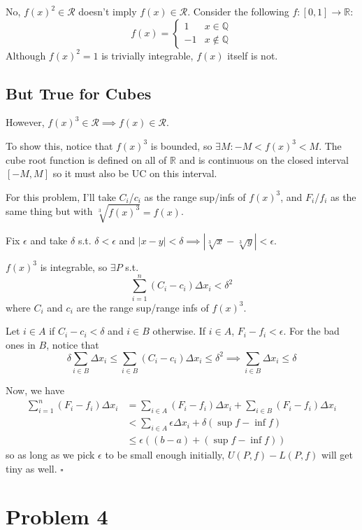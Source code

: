 \documentclass[12pt]{article}
\newcommand{\R}{\mathbb{R}}
\newcommand{\Q}{\mathbb{Q}}
\begin{document}
No, $f(x)^2 \in \mathcal{R}$ doesn't imply $f(x) \in \mathcal{R}$.
Consider the following $f: [0, 1] \to \R$:
\[f(x)=\begin{cases}
    1  & x \in \Q    \\
    -1 & x \notin \Q
  \end{cases}\]
Although $f(x)^2=1$ is trivially integrable, $f(x)$ itself is not.

\subsection{But True for Cubes}

However, $f(x)^3 \in \mathcal{R} \implies f(x) \in \mathcal{R}$.

To show this, notice that $f(x)^3$ is bounded, so $\exists M: -M < f(x)^3 < M$.
The cube root function is defined on all of $\R$ and is continuous on the
closed interval $[-M, M]$ so it must also be UC on this interval.

For this problem, I'll take $C_i$/$c_i$ as the range sup/infs of $f(x)^3$,
and $F_i$/$f_i$ as the same thing but with $\sqrt[3]{f(x)^3}=f(x)$.

Fix $\epsilon$ and take $\delta$ s.t. $\delta < \epsilon$
and $|x-y| < \delta \implies \left|\sqrt[3]{x}-\sqrt[3]{y}\right| < \epsilon$.

$f(x)^3$ is integrable, so $\exists P$ s.t.
\[\sum_{i=1}^{n} (C_i-c_i)\Delta x_i < \delta^2\]
where $C_i$ and $c_i$ are the range sup/range infs of $f(x)^3$.

Let $i \in A$ if $C_i-c_i < \delta$ and $i \in B$ otherwise.
If $i \in A$, $F_i-f_i < \epsilon$.
For the bad ones in $B$, notice that
\[\delta\sum_{i \in B} \Delta x_i \le \sum_{i \in B} (C_i-c_i)\Delta x_i \le \delta^2
  \implies \sum_{i \in B} \Delta x_i \le \delta\]

Now, we have
\begin{align*}
  \sum_{i=1}^{n} (F_i-f_i)\Delta x_i
   & = \sum_{i \in A} (F_i-f_i) \Delta x_i + \sum_{i \in B} (F_i-f_i) \Delta x_i \\
   & < \sum_{i \in A} \epsilon \Delta x_i + \delta(\sup f - \inf f)              \\
   & \le \epsilon((b-a) + (\sup f - \inf f))
\end{align*}
so as long as we pick $\epsilon$ to be small enough initially,
$U(P, f) - L(P, f)$ will get tiny as well. $\square$

\pagebreak

\section{Problem 4}
\end{document}
